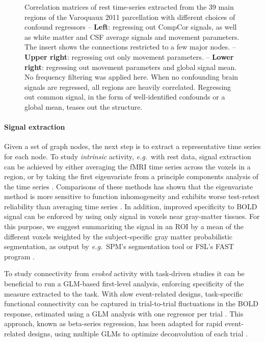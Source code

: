 \documentclass[5p]{elsarticle}
\begin{document}
\begin{figure}
\caption{
Correlation matrices of rest time-series extracted from the 39 main
regions of the Varoquaux 2011 \cite{varoquaux2011} parcellation with
different choices of confound regressors -- 
\textbf{Left}: regressing out CompCor signals, as well as white matter and
CSF average signals and movement parameters. The insert shows the
connections restricted to a few major nodes.
-- \textbf{Upper right}: regressing out only movement parameters. -- 
\textbf{Lower right}:
regressing out movement parameters and global signal mean.
No frequency filtering was applied here.
\label{fig:correlation_matrices}
When no confounding brain signals are regressed, all regions are heavily
correlated. Regressing out common signal, in the form of well-identified
confounds or a global mean, teases out the structure.
}
\end{figure}

\paragraph{Signal extraction}
%
Given a set of graph nodes, the next step is to extract a representative time
series for each node.  To study \emph{intrinsic} activity, \emph{e.g.}\ with
rest data, signal extraction can be achieved by either averaging the fMRI time
series across the voxels in a region, or by taking the first eigenvariate from a
principle components analysis of the time series \cite{friston2006}.
Comparisons of these methods has shown that the eigenvariate method is
more sensitive to function inhomogeneity \cite{craddock2012} and exhibits worse
test-retest reliability than averaging time series \cite{zuo2010}. 
In addition, improved specificity to BOLD signal can be enforced
by using only signal in voxels near gray-matter tissues. For this purpose, we
suggest summarizing the signal in an ROI by a mean of the different voxels
weighted by the subject-specific gray matter probabilistic segmentation, 
as output by \emph{e.g.}\ SPM's segmentation tool \cite{ashburner2005} or
FSL's FAST program \cite{zhang2001}.

To study connectivity from \emph{evoked} activity with task-driven studies it
can be beneficial to run a GLM-based first-level analysis, enforcing specificity
of the measure extracted to the task. With slow event-related designs,
task-specific functional connectivity can be captured in trial-to-trial
fluctuations in the BOLD response, estimated using a GLM analysis with one
regressor per trial \cite{grillon2012,rissman2004,mennes2010}. This approach,
known as beta-series regression, has been adapted for rapid event-related
designs, using multiple GLMs to optimize deconvolution of each trial
\cite{mumford2012}.
\end{document}
